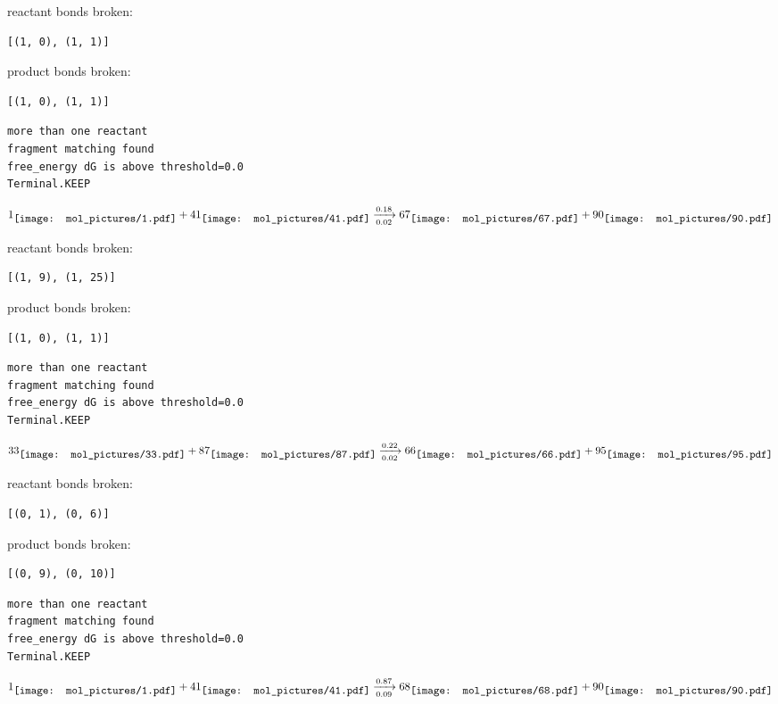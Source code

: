 \documentclass{article}
\begin{document}
reactant bonds broken:\begin{verbatim}
[(1, 0), (1, 1)]
\end{verbatim}
product bonds broken:\begin{verbatim}
[(1, 0), (1, 1)]
\end{verbatim}




\vspace{1cm}
\begin{verbatim}
more than one reactant
fragment matching found
free_energy dG is above threshold=0.0
Terminal.KEEP
\end{verbatim}
$$
1
\raisebox{-.5\height}{\texttt{[image: mol\_pictures/1.pdf]}}
+
41
\raisebox{-.5\height}{\texttt{[image: mol\_pictures/41.pdf]}}
\xrightarrow[0.02]{0.18}
67
\raisebox{-.5\height}{\texttt{[image: mol\_pictures/67.pdf]}}
+
90
\raisebox{-.5\height}{\texttt{[image: mol\_pictures/90.pdf]}}
$$


reactant bonds broken:\begin{verbatim}
[(1, 9), (1, 25)]
\end{verbatim}
product bonds broken:\begin{verbatim}
[(1, 0), (1, 1)]
\end{verbatim}




\vspace{1cm}
\begin{verbatim}
more than one reactant
fragment matching found
free_energy dG is above threshold=0.0
Terminal.KEEP
\end{verbatim}
$$
33
\raisebox{-.5\height}{\texttt{[image: mol\_pictures/33.pdf]}}
+
87
\raisebox{-.5\height}{\texttt{[image: mol\_pictures/87.pdf]}}
\xrightarrow[0.02]{0.22}
66
\raisebox{-.5\height}{\texttt{[image: mol\_pictures/66.pdf]}}
+
95
\raisebox{-.5\height}{\texttt{[image: mol\_pictures/95.pdf]}}
$$


reactant bonds broken:\begin{verbatim}
[(0, 1), (0, 6)]
\end{verbatim}
product bonds broken:\begin{verbatim}
[(0, 9), (0, 10)]
\end{verbatim}




\vspace{1cm}
\begin{verbatim}
more than one reactant
fragment matching found
free_energy dG is above threshold=0.0
Terminal.KEEP
\end{verbatim}
$$
1
\raisebox{-.5\height}{\texttt{[image: mol\_pictures/1.pdf]}}
+
41
\raisebox{-.5\height}{\texttt{[image: mol\_pictures/41.pdf]}}
\xrightarrow[0.09]{0.87}
68
\raisebox{-.5\height}{\texttt{[image: mol\_pictures/68.pdf]}}
+
90
\raisebox{-.5\height}{\texttt{[image: mol\_pictures/90.pdf]}}
$$
\end{document}
